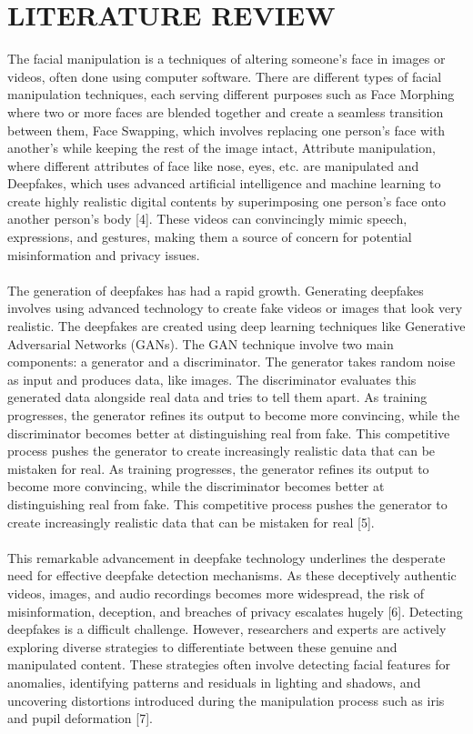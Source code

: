 \section{LITERATURE REVIEW}

The facial manipulation is a techniques of altering someone's face in images or videos, often done using computer software. There are different types of facial manipulation techniques, each serving different purposes such as Face Morphing where two or more faces are blended together and create a seamless transition between them, Face Swapping, which involves replacing one person's face with another's while keeping the rest of the image intact, Attribute manipulation, where different attributes of face like nose, eyes, etc. are manipulated and Deepfakes, which uses advanced artificial intelligence and machine learning to create highly realistic digital contents by superimposing one person's face onto another person's body [4]. These videos can convincingly mimic speech, expressions, and gestures, making them a source of concern for potential misinformation and privacy issues.
\\\\
The generation of deepfakes has had a rapid growth. Generating deepfakes involves using advanced technology to create fake videos or images that look very realistic. The deepfakes are created using deep learning techniques like Generative Adversarial Networks (GANs). The GAN technique involve two main components: a generator and a discriminator. The generator takes random noise as input and produces data, like images. The discriminator evaluates this generated data alongside real data and tries to tell them apart. As training progresses, the generator refines its output to become more convincing, while the discriminator becomes better at distinguishing real from fake. This competitive process pushes the generator to create increasingly realistic data that can be mistaken for real. As training progresses, the generator refines its output to become more convincing, while the discriminator becomes better at distinguishing real from fake. This competitive process pushes the generator to create increasingly realistic data that can be mistaken for real [5]. 
\\\\
This remarkable advancement in deepfake technology underlines the desperate need for effective deepfake detection mechanisms. As these deceptively authentic videos, images, and audio recordings becomes more widespread, the risk of misinformation, deception, and breaches of privacy escalates hugely [6]. Detecting deepfakes is a difficult challenge. However, researchers and experts are actively exploring diverse strategies to differentiate between these genuine and manipulated content. These strategies often involve detecting facial features for anomalies, identifying patterns and residuals in lighting and shadows, and uncovering distortions introduced during the manipulation process such as iris and pupil deformation [7].
